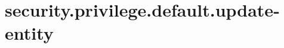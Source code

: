 \section{security.privilege.default.update-entity}
\label{configuration:SecurityPrivilegeDefaultUpdateEntity}
\AvailableInJavaOnly{\TODO}